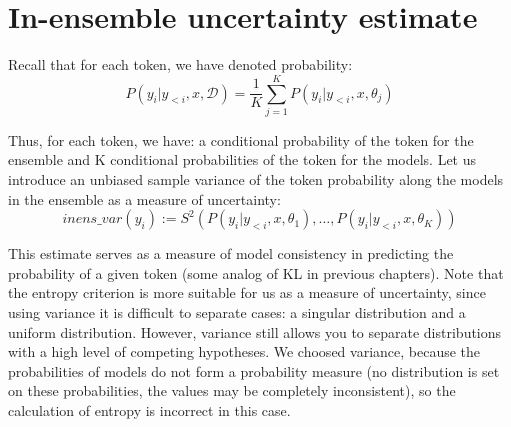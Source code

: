 \documentclass[a4paper,14pt]{extarticle}
\begin{document}
\section{In-ensemble uncertainty estimate}
	Recall that for each token, we have denoted probability:
	\begin{equation*}
		P(y_i | y_{<i}, x, \mathcal{D}) = \frac1{K} \sum_{j=1}^{K}P(y_i | y_{<i}, x, \theta_j)
	\end{equation*}
	
	Thus, for each token, we have: a conditional probability of the token for the ensemble and K conditional probabilities of the token for the models. Let us introduce an unbiased sample variance of the token probability along the models in the ensemble as a measure of uncertainty:
	\begin{equation}
		inens\_var(y_i) := S^2(P(y_i | y_{<i}, x, \theta_1), \dots, P(y_i | y_{<i}, x, \theta_K))
	\end{equation}
	
	This estimate serves as a measure of model consistency in predicting the probability of a given token (some analog of KL in previous chapters). Note that the entropy criterion is more suitable for us as a measure of uncertainty, since using variance it is difficult to separate cases: a singular distribution and a uniform distribution. However, variance still allows you to separate distributions with a high level of competing hypotheses. We choosed variance, because the probabilities of models do not form a probability measure (no distribution is set on these probabilities, the values may be completely inconsistent), so the calculation of entropy is incorrect in this case.
	
\end{document}
